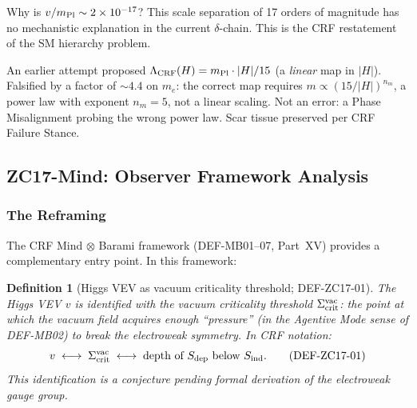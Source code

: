 \documentclass[12pt, a4paper]{article}
\newtheorem{definition}{Definition}[section]
\begin{document}
\begin{openqbox}[title={GAP-ZC17-03: Hierarchy Problem (Open, Critical)}]
Why is $v/m_{\rm Pl}\sim 2\times10^{-17}$?
This scale separation of 17 orders of magnitude has no
mechanistic explanation in the current $\delta$-chain.
This is the CRF restatement of the SM hierarchy problem.
\end{openqbox}

\begin{formalbox}[title={Phase Misalignment PM-ZC17-01 (Registered)}]
An earlier attempt proposed $\Lambda_{\rm CRF}(H)=m_{\rm Pl}\cdot|H|/15$
(a \emph{linear} map in $|H|$). Falsified by a factor of $\sim4.4$
on $m_e$: the correct map requires $m\propto(15/|H|)^{n_m}$,
a power law with exponent $n_m=5$, not a linear scaling.
Not an error: a Phase Misalignment probing the wrong power law.
Scar tissue preserved per CRF Failure Stance.
\end{formalbox}

\subsection{ZC17-Mind: Observer Framework Analysis}
\label{zc17:sec:mind}

\subsubsection{The Reframing}

The CRF Mind $\otimes$ Barami framework (DEF-MB01--07, Part~XV)
provides a complementary entry point. In this framework:

\begin{definition}[Higgs VEV as vacuum criticality threshold;
  DEF-ZC17-01]
\label{zc17:def:v-threshold}
The Higgs VEV $v$ is identified with the vacuum criticality
threshold $\Sigma_{\rm crit}^{\rm vac}$: the point at which
the vacuum field acquires enough ``pressure'' (in the Agentive
Mode sense of DEF-MB02) to break the electroweak symmetry.
In CRF notation:
\begin{equation}
  v \;\longleftrightarrow\; \Sigma_{\rm crit}^{\rm vac}
  \;\longleftrightarrow\; \text{depth of } S_{\rm dep}
  \text{ below } S_{\rm ind}.
  \tag{DEF-ZC17-01}\label{zc17:eq:v-def}
\end{equation}
This identification is a conjecture pending formal derivation
of the electroweak gauge group.
\end{definition}
\end{document}
